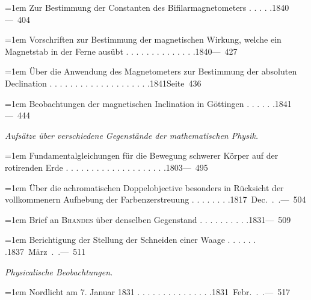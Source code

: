 \noindent\hangindent=1em Zur Bestimmung der Constanten des Bifilarmagnetometers . . . . .\unskip\hspace{1em plus 1fill}\mbox{1840\quad — 404}\par\smallskip
\noindent\hangindent=1em Vorschriften zur Bestimmung der magnetischen Wirkung, welche ein Magnetstab in der Ferne ausübt . . . . . . . . . . . . . .\unskip\hspace{1em plus 1fill}\mbox{1840\quad — 427}\par\smallskip
{}
\noindent\hangindent=1em Über die Anwendung des Magnetometers zur Bestimmung der absoluten Declination . . . . . . . . . . . . . . . . . . . .\unskip\hspace{1em plus 1fill}\mbox{1841\quad Seite 436}\par\smallskip
\noindent\hangindent=1em Beobachtungen der magnetischen Inclination in Göttingen . . . . . .\unskip\hspace{1em plus 1fill}\mbox{1841\quad — 444}\par\smallskip
\par{}\medskip\noindent\textit{Aufsätze über verschiedene Gegenstände der mathematischen Physik.}\par\smallskip
\noindent\hangindent=1em Fundamentalgleichungen für die Bewegung schwerer Körper auf der rotirenden Erde . . . . . . . . . . . . . . . . . . . .\unskip\hspace{1em plus 1fill}\mbox{1803\quad — 495}\par\smallskip
\noindent\hangindent=1em Über die achromatischen Doppelobjective besonders in Rücksicht der vollkommenern Aufhebung der Farbenzerstreuung . . . . . . . .\unskip\hspace{1em plus 1fill}\mbox{1817 Dec. . .\quad — 504}\par\smallskip
\noindent\hangindent=1em Brief an \textsc{Brandes} über denselben Gegenstand . . . . . . . . . .\unskip\hspace{1em plus 1fill}\mbox{1831\quad — 509}\par\smallskip
\noindent\hangindent=1em Berichtigung der Stellung der Schneiden einer Waage . . . . . . .\unskip\hspace{1em plus 1fill}\mbox{1837 März . .\quad — 511}\par\smallskip
\par{}\medskip\noindent\textit{Physicalische Beobachtungen.}\par\smallskip
\noindent\hangindent=1em Nordlicht am 7. Januar 1831 . . . . . . . . . . . . . . .\unskip\hspace{1em plus 1fill}\mbox{1831 Febr. . .\quad — 517}\par\smallskip
